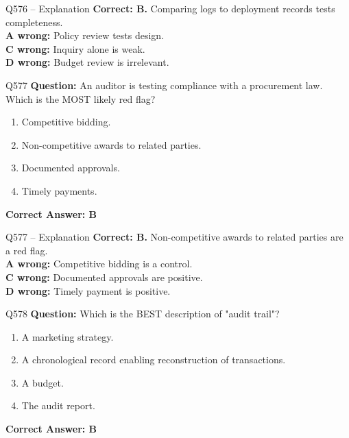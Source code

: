 \documentclass[aspectratio=169,10pt]{beamer}
\begin{document}
	\begin{frame}[t]{Q576 -- Explanation}
		\small
		\textbf{Correct: B.} Comparing logs to deployment records tests completeness. \\[4pt]
		\textbf{A wrong:} Policy review tests design. \\[2pt]
		\textbf{C wrong:} Inquiry alone is weak. \\[2pt]
		\textbf{D wrong:} Budget review is irrelevant.
	\end{frame}
	
	\begin{frame}[t]{Q577}
		\small
		\textbf{Question:} An auditor is testing compliance with a procurement law. Which is the MOST likely red flag?
		\begin{enumerate}[label=\Alph*.,itemsep=1pt,topsep=2pt]
			\item Competitive bidding.
			\item Non-competitive awards to related parties.
			\item Documented approvals.
			\item Timely payments.
		\end{enumerate}
		\vspace{4pt}
		\textbf{Correct Answer: B}
	\end{frame}
	
	\begin{frame}[t]{Q577 -- Explanation}
		\small
		\textbf{Correct: B.} Non-competitive awards to related parties are a red flag. \\[4pt]
		\textbf{A wrong:} Competitive bidding is a control. \\[2pt]
		\textbf{C wrong:} Documented approvals are positive. \\[2pt]
		\textbf{D wrong:} Timely payment is positive.
	\end{frame}
	
	\begin{frame}[t]{Q578}
		\small
		\textbf{Question:} Which is the BEST description of "audit trail"?
		\begin{enumerate}[label=\Alph*.,itemsep=1pt,topsep=2pt]
			\item A marketing strategy.
			\item A chronological record enabling reconstruction of transactions.
			\item A budget.
			\item The audit report.
		\end{enumerate}
		\vspace{4pt}
		\textbf{Correct Answer: B}
	\end{frame}
	
\end{document}
